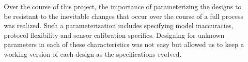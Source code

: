 \documentclass{article}
\begin{document}
\begin{flushleft}
Over the course of this project, the importance of parameterizing the designs to be resistant to the inevitable changes that occur over the course of a full process was realized. Such a parameterization includes specifying model inaccuracies, protocol flexibility and sensor calibration specifics. Designing for unknown parameters in each of these characteristics was not easy but allowed us to keep a working version of each design as the specifications evolved. 
\end{flushleft}
\end{document}
